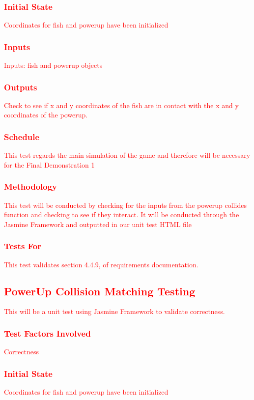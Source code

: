 \documentclass[11pt, oneside]{article}   	%
\begin{document}
\subsubsection{\textcolor{red}{Initial State}}
\textcolor{red}{Coordinates for fish and powerup have been initialized}
\subsubsection{\textcolor{red}{Inputs}}
\textcolor{red}{Inputs: fish and powerup objects}
\subsubsection{\textcolor{red}{Outputs}}
\textcolor{red}{Check to see if x and y coordinates of the fish are in contact with the x and y coordinates of the powerup.}
\subsubsection{\textcolor{red}{Schedule}}
\textcolor{red}{This test regards the main simulation of the game and therefore will be necessary for the Final Demonstration 1}
\subsubsection{\textcolor{red}{Methodology}}
\textcolor{red}{This test will be conducted by checking for the inputs from the powerup collides function and checking to see if they interact. It will be conducted through the Jasmine Framework and outputted in our unit test HTML file}
\subsubsection{\textcolor{red}{Tests For}}
\textcolor{red}{This test validates section 4.4.9, of requirements documentation.}




\subsection{\textcolor{red}{PowerUp Collision Matching Testing}}
\textcolor{red}{This will be a unit test using Jasmine Framework to validate correctness.}
\subsubsection{\textcolor{red}{Test Factors Involved}}
\textcolor{red}{Correctness}
\subsubsection{\textcolor{red}{Initial State}}
\textcolor{red}{Coordinates for fish and powerup have been initialized}
\end{document}

